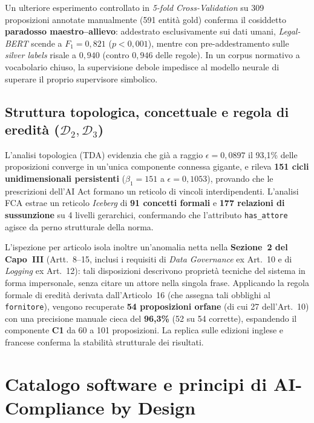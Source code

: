 \documentclass[12pt,a4paper,oneside]{article}
\begin{document}
Un ulteriore esperimento controllato in \emph{5-fold Cross-Validation} su 309 proposizioni annotate manualmente (591 entità gold) conferma il cosiddetto \textbf{paradosso maestro--allievo}: addestrato esclusivamente sui dati umani, \emph{Legal-BERT} scende a $F_1 = 0,821$ ($p < 0,001$), mentre con pre-addestramento sulle \emph{silver labels} risale a $0,940$ (contro $0,946$ delle regole). In un corpus normativo a vocabolario chiuso, la supervisione debole impedisce al modello neurale di superare il proprio supervisore simbolico.

\subsection{Struttura topologica, concettuale e regola di eredità (\texorpdfstring{$\mathcal{D}_2, \mathcal{D}_3$}{D2, D3})}
L'analisi topologica (TDA) evidenzia che già a raggio $\epsilon = 0,0897$ il 93,1\% delle proposizioni converge in un'unica componente connessa gigante, e rileva \textbf{151 cicli unidimensionali persistenti} ($\beta_1 = 151$ a $\epsilon = 0,1053$), provando che le prescrizioni dell'AI Act formano un reticolo di vincoli interdipendenti. L'analisi FCA estrae un reticolo \emph{Iceberg} di \textbf{91 concetti formali} e \textbf{177 relazioni di sussunzione} su 4 livelli gerarchici, confermando che l'attributo \texttt{has\_attore} agisce da perno strutturale della norma.

L'ispezione per articolo isola inoltre un'anomalia netta nella \textbf{Sezione~2 del Capo~III} (Artt.~8--15, inclusi i requisiti di \emph{Data Governance} ex Art.~10 e di \emph{Logging} ex Art.~12): tali disposizioni descrivono proprietà tecniche del sistema in forma impersonale, senza citare un attore nella singola frase. Applicando la regola formale di eredità derivata dall'Articolo~16 (che assegna tali obblighi al \texttt{fornitore}), vengono recuperate \textbf{54 proposizioni orfane} (di cui 27 dell'Art.~10) con una precisione manuale cieca del \textbf{96,3\%} (52 su 54 corrette), espandendo il componente \textbf{C1} da 60 a 101 proposizioni. La replica sulle edizioni inglese e francese conferma la stabilità strutturale dei risultati.

\section{Catalogo software e principi di AI-Compliance by Design}
\end{document}
